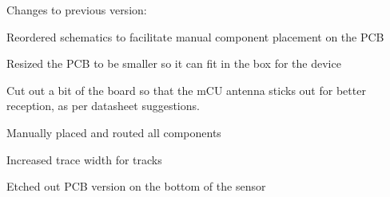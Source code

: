 Changes to previous version\+:


\begin{DoxyItemize}
\item Reordered schematics to facilitate manual component placement on the P\+CB
\item Resized the P\+CB to be smaller so it can fit in the box for the device
\item Cut out a bit of the board so that the m\+CU antenna sticks out for better reception, as per datasheet suggestions.
\item Manually placed and routed all components
\item Increased trace width for tracks
\item Etched out P\+CB version on the bottom of the sensor 
\end{DoxyItemize}